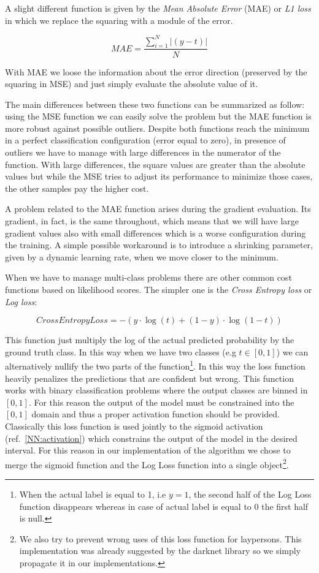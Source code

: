 \documentclass{standalone}
\begin{document}
A slight different function is given by the \emph{Mean Absolute Error} (MAE) or \emph{L1 loss} in which we replace the squaring with a module of the error.

$$
MAE = \frac{\sum_{i=1}^{N}|\left( y - t \right)|}{N}
$$

With MAE we loose the information about the error direction (preserved by the squaring in MSE) and just simply evaluate the absolute value of it.

The main differences between these two functions can be summarized as follow: using the MSE function we can easily solve the problem but the MAE function is more robust against possible outliers.
Despite both functions reach the minimum in a perfect classification configuration (error equal to zero), in presence of outliers we have to manage with large differences in the numerator of the function.
With large differences, the square values are greater than the absolute values but while the MSE tries to adjust its performance to minimize those cases, the other samples pay the higher cost.

A problem related to the MAE function arises during the gradient evaluation.
Its gradient, in fact, is the same throughout, which means that we will have large gradient values also with small differences which is a worse configuration during the training.
A simple possible workaround is to introduce a shrinking parameter, given by a dynamic learning rate, when we move closer to the minimum.

When we have to manage multi-class problems there are other common cost functions based on likelihood scores.
The simpler one is the \emph{Cross Entropy loss} or \emph{Log loss}:

$$
CrossEntropyLoss = -(y\cdot\log(t) + (1 - y)\cdot\log(1 - t))
$$

This function just multiply the log of the actual predicted probability by the ground truth class.
In this way when we have two classes (e.g $t \in [0, 1]$) we can alternatively nullify the two parts of the function\footnote{
  When the actual label is equal to 1, i.e $y=1$, the second half of the Log Loss function disappears whereas in case of actual label is equal to 0 the first half is null.
}.
In this way the loss function heavily penalizes the predictions that are confident but wrong.
This function works with binary classification problems where the output classes are binned in $[0, 1]$.
For this reason the output of the model must be constrained into the $[0, 1]$ domain and thus a proper activation function should be provided.
Classically this loss function is used jointly to the sigmoid activation (ref.~\ref{NN:activation}) which constrains the output of the model in the desired interval.
For this reason in our implementation of the algorithm we chose to merge the sigmoid function and the Log Loss function into a single object\footnote{
  We also try to prevent wrong uses of this loss function for laypersons.
  This implementation was already suggested by the \textsf{darknet} library so we simply propagate it in our implementations.
}.
\end{document}
